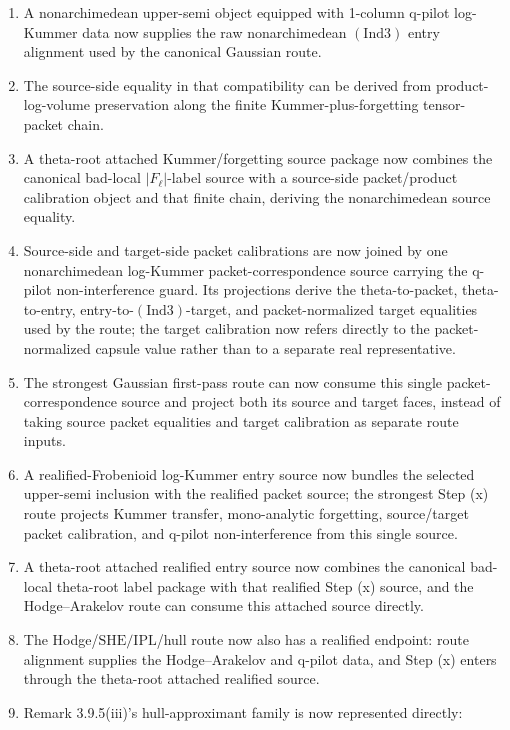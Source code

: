 \documentclass[11pt]{article}
\newcommand{\Ind}{\ensuremath{\mathrm{Ind}}}
\newcommand{\SHE}{\ensuremath{\mathrm{SHE}}}
\newcommand{\IPL}{\ensuremath{\mathrm{IPL}}}
\theoremstyle{plain}
\theoremstyle{definition}
\theoremstyle{remark}
\begin{document}
\begin{enumerate}
  theta-root label source; canonical-label preservation feeds the factored
  \SHE{} square/full-label obligations.
\item A nonarchimedean upper-semi object equipped with 1-column q-pilot
  log-Kummer data now supplies the raw nonarchimedean \((\Ind3)\) entry
  alignment used by the canonical Gaussian route.
\item The source-side equality in that compatibility can be derived from
  product-log-volume preservation along the finite Kummer-plus-forgetting
  tensor-packet chain.
\item A theta-root attached Kummer/forgetting source package now combines the
  canonical bad-local \(|F_\ell|\)-label source with a source-side
  packet/product calibration object and that finite chain, deriving the
  nonarchimedean source equality.
\item Source-side and target-side packet calibrations are now joined by one
  nonarchimedean log-Kummer packet-correspondence source carrying the q-pilot
  non-interference guard.  Its projections derive the theta-to-packet,
  theta-to-entry, entry-to-\((\Ind3)\)-target, and packet-normalized target
  equalities used by the route; the target calibration now refers directly to
  the packet-normalized capsule value rather than to a separate real
  representative.
\item The strongest Gaussian first-pass route can now consume this single
  packet-correspondence source and project both its source and target faces,
  instead of taking source packet equalities and target calibration as separate
  route inputs.
\item A realified-Frobenioid log-Kummer entry source now bundles the selected
  upper-semi inclusion with the realified packet source; the strongest Step (x)
  route projects Kummer transfer, mono-analytic forgetting, source/target
  packet calibration, and q-pilot non-interference from this single source.
\item A theta-root attached realified entry source now combines the canonical
  bad-local theta-root label package with that realified Step (x) source, and
  the Hodge--Arakelov route can consume this attached source directly.
\item The Hodge/\(\SHE/\IPL\)/hull route now also has a realified endpoint:
  route alignment supplies the Hodge--Arakelov and q-pilot data, and Step (x)
  enters through the theta-root attached realified source.
\item Remark 3.9.5(iii)'s hull-approximant family is now represented directly:

\end{enumerate}
\end{document}

